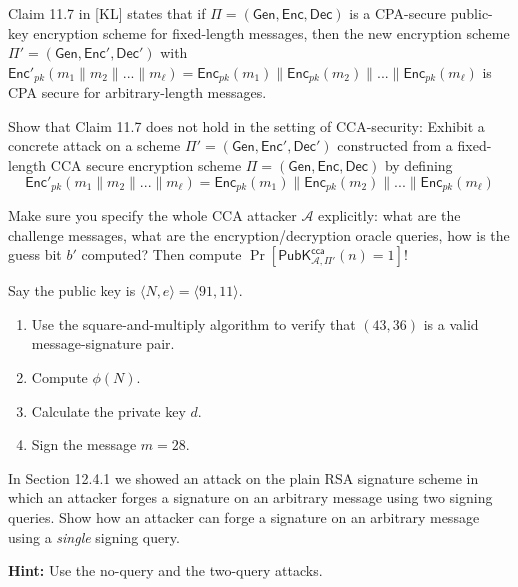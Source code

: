 \documentclass[a4paper,10pt,landscape,twocolumn]{scrartcl}
\begin{document}
	
\begin{exercise}
Claim 11.7 in [KL] states that if $\Pi=(\mathsf{Gen},\mathsf{Enc}, \mathsf{Dec})$ is a CPA-secure public-key encryption scheme for fixed-length messages, then the new encryption scheme $\Pi'=(\mathsf{Gen},\mathsf{Enc}', \mathsf{Dec}')$ with  $\mathsf{Enc}'_{pk}(m_1\|m_2\|...\|m_\ell)=\mathsf{Enc}_{pk}(m_1)\|\mathsf{Enc}_{pk}(m_2)\|...\|\mathsf{Enc}_{pk}(m_\ell)$ is CPA secure for arbitrary-length messages.

	Show that Claim 11.7 does not hold in the setting of CCA-security: Exhibit a concrete attack on a scheme $\Pi'=(\mathsf{Gen},\mathsf{Enc}', \mathsf{Dec}')$ constructed from a fixed-length CCA secure encryption scheme $\Pi=(\mathsf{Gen},\mathsf{Enc}, \mathsf{Dec})$ by defining 
\[
  \mathsf{Enc}'_{pk}(m_1\|m_2\|...\|m_\ell)=\mathsf{Enc}_{pk}(m_1)\|\mathsf{Enc}_{pk}(m_2)\|...\|\mathsf{Enc}_{pk}(m_\ell) \]

Make sure you specify the whole CCA attacker $\mathcal{A}$ explicitly: what are the
challenge messages, what are the encryption/decryption oracle queries,
how is the guess bit $b'$ computed? Then compute
$\Pr[\mathsf{PubK}^{\mathsf{cca}}_{\mathcal{A}, \Pi'}(n)=1]$!
\end{exercise}

\enlargethispage{1cm}

\begin{exercise}
\begin{subex}
Say the public key is $\langle N,e \rangle=\langle 91,11\rangle$.
\begin{enumerate}
\item Use the square-and-multiply algorithm to verify that $(43,36)$ is a valid message-signature pair.
\item Compute $\phi(N)$.
\item Calculate the private key $d$.
\item Sign the message $m=28$.
\end{enumerate}
\end{subex}

\begin{subex}

In Section 12.4.1 we showed an attack on the
plain RSA signature scheme in which an attacker forges a signature
on an arbitrary message using two signing queries. Show how an
attacker can forge a signature on an arbitrary message using a
\emph{single} signing query.

\textbf{Hint:} Use the no-query and the two-query attacks. 
\end{subex}

\end{exercise}
\end{document}
